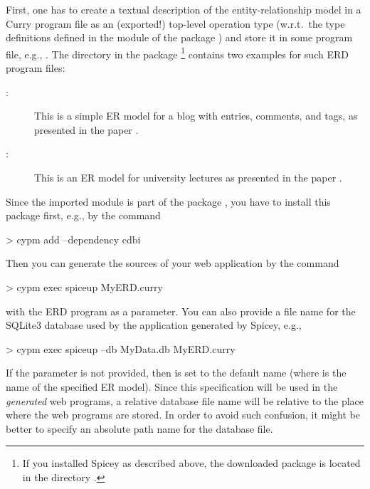 First, one has to create a textual description of the
entity-relationship model
in a Curry program file as an (exported!) top-level operation type 
(w.r.t.\ the type definitions defined in the module 
of the package )
and store it in some program file, e.g., .
The directory  in the package \footnote{%
If you installed Spicey as described above,
the downloaded  package is located in the directory
.}
contains two examples for such ERD program files:
\begin{description}
\item[:]
This is a simple ER model for a blog with entries, comments,
and tags, as presented in the paper \cite{HanusKoschnicke14TPLP}.
\item[:]
This is an ER model for university lectures as
presented in the paper \cite{BrasselHanusMueller08PADL}.
\end{description}
%
Since the imported module  is part of the package
, you have to install this package first, e.g., by the command
\begin{curry}
> cypm add --dependency cdbi
\end{curry}
Then you can generate the sources of your web application
by the command
\begin{curry}
> cypm exec spiceup MyERD.curry
\end{curry}
with the ERD program as a parameter.
You can also provide a file name for the SQLite3 database used
by the application generated by Spicey, e.g.,
\begin{curry}
> cypm exec spiceup --db MyData.db MyERD.curry
\end{curry}
If the parameter  is not provided,
then  is set to the default name 
(where  is the name of the specified ER model).
Since this specification will be used in the \emph{generated} web programs,
a relative database file name will be relative to the place where
the web programs are stored.
In order to avoid such confusion, it might be better to specify
an absolute path name for the database file.

